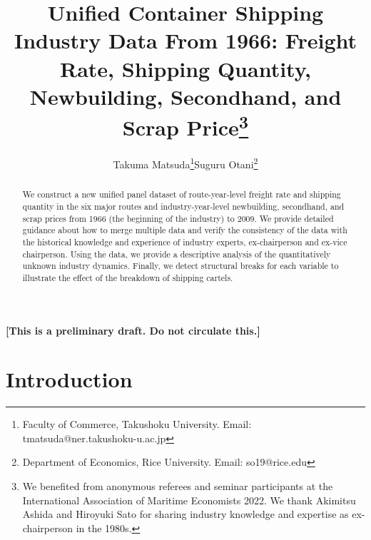 \documentclass[11pt]{article}
\title{Unified Container Shipping Industry Data From 1966: Freight Rate, Shipping Quantity, Newbuilding, Secondhand, and Scrap Price\thanks{We benefited from anonymous referees and seminar participants at the International Association of Maritime Economists 2022. We thank Akimitsu Ashida and Hiroyuki Sato for sharing industry knowledge and expertise as ex-chairperson in the 1980s.}}
\author{Takuma Matsuda\thanks{Faculty of Commerce, Takushoku University. Email: tmatsuda@ner.takushoku-u.ac.jp}\quad  Suguru Otani\thanks{Department of Economics, Rice University. Email: so19@rice.edu}}
\begin{document}
\maketitle

\begin{center}
    \textbf{[This is a preliminary draft. Do not circulate this.]}
\end{center}


\begin{abstract}
We construct a new unified panel dataset of route-year-level freight rate and shipping quantity in the six major routes and industry-year-level newbuilding, secondhand, and scrap prices from 1966 (the beginning of the industry) to 2009. We provide detailed guidance about how to merge multiple data and verify the consistency of the data with the historical knowledge and experience of industry experts, ex-chairperson and ex-vice chairperson. Using the data, we provide a descriptive analysis of the quantitatively unknown industry dynamics. Finally, we detect structural breaks for each variable to illustrate the effect of the breakdown of shipping cartels.
\end{abstract} 


\section{Introduction}\label{sec:introduction}
\end{document}
